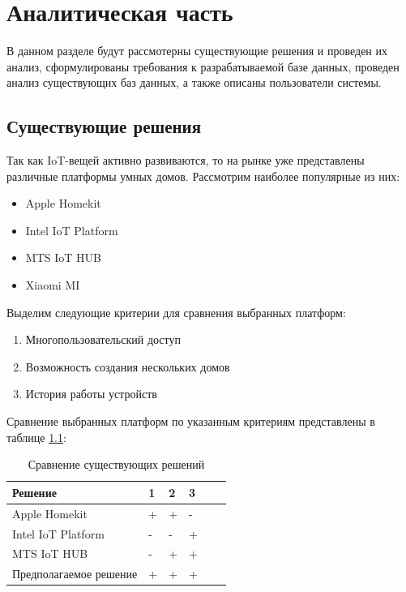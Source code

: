 \chapter{Аналитическая часть}

В данном разделе будут рассмотерны существующие решения и проведен их анализ, 
сформулированы требования к разрабатываемой 
базе данных, проведен анализ существующих баз данных, а также описаны
пользователи системы.

\section{Существующие решения}

Так как IoT-вещей активно развиваются, то на рынке уже представлены различные платформы умных домов. 
Рассмотрим наиболее популярные из них:
\begin{itemize}
    \item Apple Homekit~\cite{apple}
    \item Intel IoT Platform~\cite{intel}
    \item MTS IoT HUB~\cite{mts}
    \item Xiaomi MI~\cite{xmi}
\end{itemize}

Выделим следующие критерии для сравнения выбранных платформ:
\begin{enumerate}
    \item[1)] Многопользовательский доступ
    \item[2)] Возможность создания нескольких домов
    \item[3)] История работы устройств
\end{enumerate}

Сравнение выбранных платформ по указанным критериям представлены в таблице \ref{tab:solutions}:
\begin{table}[!ht]
    \centering
    \caption{\label{tab:solutions} Сравнение существующих решений}
    \begin{tabular}{|l|l|l|l|l|l|}
    \hline
        Решение & 1 & 2 & 3  \\ \hline
        Apple Homekit & + & + & - \\ \hline
        Intel IoT Platform & - & - & + \\ \hline
        MTS IoT HUB & - & + & + \\ \hline
        Предполагаемое решение & + & + & + \\ \hline
    \end{tabular}
\end{table}

